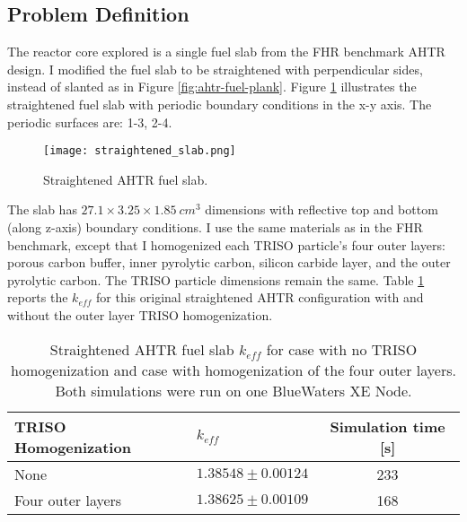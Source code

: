 \subsection{Problem Definition}
The reactor core explored is a single fuel slab from the \gls{FHR} benchmark
\gls{AHTR} design.
I modified the fuel slab to be straightened with perpendicular sides, instead 
of slanted as in Figure \ref{fig:ahtr-fuel-plank}. 
Figure \ref{fig:straightened_slab} illustrates the straightened fuel slab with 
periodic boundary conditions in the x-y axis. 
The periodic surfaces are: 1-3, 2-4. 
\begin{figure}[]
    \centering
    \texttt{[image: straightened\_slab.png]}
    \raggedright
    \caption{Straightened \acrfull{AHTR} fuel slab.}
    \label{fig:straightened_slab}
\end{figure}
The slab has $27.1 \times 3.25 \times 1.85\ cm^3$ dimensions with reflective 
top and bottom (along z-axis) boundary conditions.
I use the same materials as in the \gls{FHR} benchmark, except that I homogenized 
each \gls{TRISO} particle's four outer layers: 
porous carbon buffer, inner pyrolytic carbon, silicon carbide layer, and the 
outer pyrolytic carbon. 
The \gls{TRISO} particle dimensions remain the same.
Table \ref{tab:keff_triso} reports the $k_{eff}$ for this original straightened 
\gls{AHTR} configuration with and without the outer layer \gls{TRISO} 
homogenization.
\begin{table}[]
    \centering
    \onehalfspacing
    \caption{Straightened \acrfull{AHTR} fuel slab $k_{eff}$ for case with 
    no \gls{TRISO} homogenization and case with homogenization of the four outer 
    layers. Both simulations were run on one BlueWaters XE Node.}
	\label{tab:keff_triso}
    \footnotesize
    \begin{tabular}{llc}
    \hline 
    \textbf{TRISO Homogenization}& \textbf{$k_{eff}$} & \textbf{Simulation time [s]}  \\
    \hline 
    None & $1.38548 \pm 0.00124$ & 233\\ 
    Four outer layers & $1.38625 \pm 0.00109$ & 168\\ 
    \hline
    \end{tabular}
\end{table}
